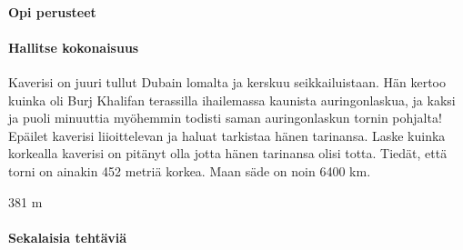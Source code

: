 \begin{tehtavasivu}

\paragraph*{Opi perusteet}

\paragraph*{Hallitse kokonaisuus}
  \begin{tehtava}
	Kaverisi on juuri tullut Dubain lomalta ja kerskuu seikkailuistaan. Hän kertoo kuinka oli Burj Khalifan terassilla ihailemassa kaunista auringonlaskua, ja kaksi ja puoli minuuttia myöhemmin todisti saman auringonlaskun tornin pohjalta! Epäilet kaverisi liioittelevan ja haluat tarkistaa hänen tarinansa. Laske kuinka korkealla kaverisi on pitänyt olla jotta hänen tarinansa olisi totta. Tiedät, että torni on ainakin 452 metriä korkea. Maan säde on noin 6400 km.
	\begin{vastaus}
	381 m
  	\end{vastaus}
  \end{tehtava}
\paragraph*{Sekalaisia tehtäviä}

\end{tehtavasivu}

